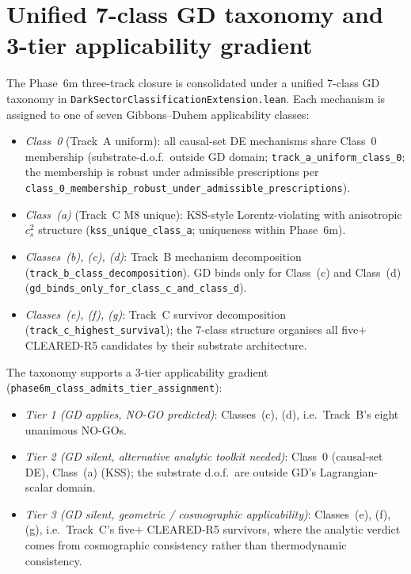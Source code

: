 \documentclass[aps,prd,reprint,nofootinbib,superscriptaddress]{revtex4-2}
\begin{document}
\section{Unified 7-class GD taxonomy and 3-tier applicability gradient}
\label{sec:phase6m-taxonomy}

The Phase~6m three-track closure is consolidated under a unified 7-class
GD taxonomy in \texttt{DarkSectorClassificationExtension.lean}. Each
mechanism is assigned to one of seven Gibbons--Duhem applicability classes:

\begin{itemize}
\item \emph{Class~0} (Track~A uniform): all causal-set DE mechanisms
  share Class~0 membership (substrate-d.o.f.\ outside GD domain;
  \texttt{track\_a\_uniform\_class\_0}; the membership is robust under
  admissible prescriptions per
  \texttt{class\_0\_membership\_robust\_under\_admissible\_prescriptions}).
\item \emph{Class~(a)} (Track~C M8 unique): KSS-style Lorentz-violating
  with anisotropic $c_s^2$ structure (\texttt{kss\_unique\_class\_a};
  uniqueness within Phase~6m).
\item \emph{Classes~(b), (c), (d)}: Track~B mechanism decomposition
  (\texttt{track\_b\_class\_decomposition}). GD binds only for
  Class~(c) and Class~(d) (\texttt{gd\_binds\_only\_for\_class\_c\_and\_class\_d}).
\item \emph{Classes~(e), (f), (g)}: Track~C survivor decomposition
  (\texttt{track\_c\_highest\_survival}); the 7-class structure
  organises all five+ CLEARED-R5 candidates by their substrate
  architecture.
\end{itemize}

The taxonomy supports a 3-tier applicability gradient
(\texttt{phase6m\_class\_admits\_tier\_assignment}):

\begin{itemize}
\item \emph{Tier 1 (GD applies, NO-GO predicted)}: Classes~(c), (d),
  i.e.\ Track~B's eight unanimous NO-GOs.
\item \emph{Tier 2 (GD silent, alternative analytic toolkit needed)}:
  Class~0 (causal-set DE), Class~(a) (KSS); the substrate
  d.o.f.\ are outside GD's Lagrangian-scalar domain.
\item \emph{Tier 3 (GD silent, geometric / cosmographic
  applicability)}: Classes~(e), (f), (g), i.e.\ Track~C's five+ CLEARED-R5
  survivors, where the analytic verdict comes from cosmographic
  consistency rather than thermodynamic consistency.
\end{itemize}
\end{document}
